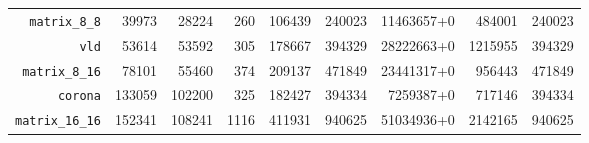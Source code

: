 {\begin{tabular}{|r|r|r|r|r|r|r|r|r|}
   \texttt{matrix\_8\_8}         &   39973 &     28224 &       260 &  106439 &  240023 &  11463657+0 &  484001 &  240023 \\
   \texttt{vld}                  &   53614 &     53592 &       305 &  178667 &  394329 &  28222663+0 & 1215955 &  394329 \\
   \texttt{matrix\_8\_16}        &   78101 &     55460 &       374 &  209137 &  471849 &  23441317+0 &  956443 &  471849 \\
   \texttt{corona}               &  133059 &    102200 &       325 &  182427 &  394334 &   7259387+0 &  717146 &  394334 \\
   \texttt{matrix\_16\_16}       &  152341 &    108241 &      1116 &  411931 &  940625 &  51034936+0 & 2142165 &  940625 \\
   \hline
 \end{tabular}
 }
